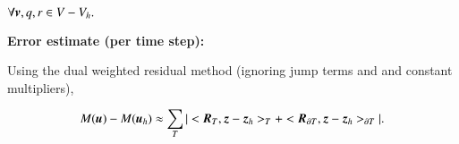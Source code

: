 $\forall \mbox{\boldmath$ v$}, q, r \in V - V_h.$

{\bf Error estimate (per time step):}

Using the dual weighted residual method (ignoring jump terms and and
constant multipliers),

\begin{equation}
M(\mbox{\boldmath$ u$}) - M(\mbox{\boldmath$ u$}_h) \approx  \sum_T |<\mbox{\boldmath$ R$}_T, \mbox{\boldmath$ z$} - \mbox{\boldmath$ z$}_h>_T +
<\mbox{\boldmath$ R$}_{\partial T}, \mbox{\boldmath$ z$} - \mbox{\boldmath$ z$}_h>_{\partial T}| .
\end{equation}








